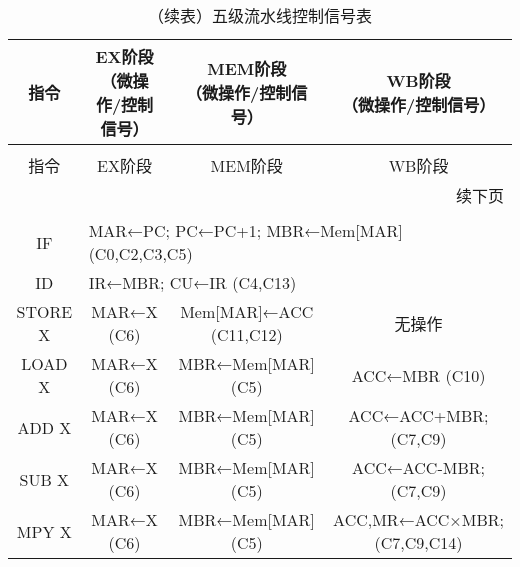 \documentclass[lang=cn,a4paper,newtx]{elegantpaper}
\begin{document}

\begin{longtable}{cccc}
  \caption{五级流水线控制信号表} \label{tab:compact_pipeline}\\
  \toprule
  指令 & \makecell{EX阶段\\（微操作/控制信号）} & \makecell{MEM阶段\\（微操作/控制信号）} & \makecell{WB阶段\\（微操作/控制信号）} \\
  \midrule
  \endfirsthead

  \toprule
  \caption[]{（续表）五级流水线控制信号表} \\
  \toprule
  指令 & EX阶段 & MEM阶段 & WB阶段 \\
  \midrule
  \endhead

  \midrule
  \multicolumn{4}{r}{续下页} \\
  \midrule
  \endfoot

  \bottomrule
  \endlastfoot

  \multicolumn{4}{l}{所有指令共享的公共阶段：} \\
  IF & \multicolumn{3}{l}{MAR←PC; PC←PC+1; MBR←Mem[MAR] \quad (C0,C2,C3,C5)} \\
  ID & \multicolumn{3}{l}{IR←MBR; CU←IR \quad (C4,C13)} \\
  \midrule

  STORE X & 
  MAR←X \quad (C6) & 
  Mem[MAR]←ACC \quad (C11,C12) & 
  无操作 \\
  \midrule

  LOAD X & 
  MAR←X \quad (C6) & 
  MBR←Mem[MAR] \quad (C5) & 
  ACC←MBR \quad (C10) \\
  \midrule

  ADD X & 
  MAR←X \quad (C6) & 
  MBR←Mem[MAR] \quad (C5) & 
  \makecell{ACC←ACC+MBR;\\ \quad (C7,C9)} \\
  
  SUB X & 
  MAR←X \quad (C6) & 
  MBR←Mem[MAR] \quad (C5) & 
  \makecell{ACC←ACC-MBR;\\ \quad (C7,C9)} \\
  
  MPY X & 
  MAR←X \quad (C6) & 
  MBR←Mem[MAR] \quad (C5) & 
  \makecell{ACC,MR←ACC×MBR;\\ \quad (C7,C9,C14)} \\
  \midrule


\end{longtable}
\end{document}
